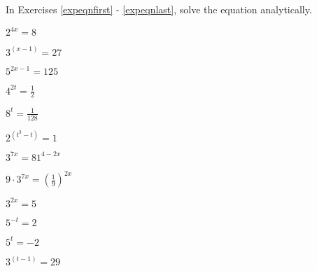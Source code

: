 \documentclass{ximera}
\begin{document}
	\author{Stitz-Zeager}



\label{ExercisesforExponentialEquationsandInequalities}

\begin{question}
In Exercises \ref{expeqnfirst} - \ref{expeqnlast}, solve the equation analytically.

\begin{problem}\label{expeqnfirst}
$2^{4x} = 8$
\end{problem}

\begin{problem}
$3^{(x - 1)} = 27$     
\end{problem} 

\begin{problem}
$5^{2x-1} = 125$     
\end{problem}  

\begin{problem}
$4^{2t} = \frac{1}{2}$     
\end{problem}

\begin{problem}
$8^{t} = \frac{1}{128}$     
\end{problem}

\begin{problem}
$2^{(t^{3} - t)} = 1$      
\end{problem}

\begin{problem}
$3^{7x} = 81^{4-2x}$     
\end{problem} 

\begin{problem}
$9 \cdot 3^{7x} = \left(\frac{1}{9}\right)^{2x}$ 
\end{problem} 

\begin{problem}
$3^{2x} = 5$    
\end{problem}   

\begin{problem}
$5^{-t} = 2$     
\end{problem}

\begin{problem}
$5^{t} = -2$      
\end{problem}

\begin{problem}
$3^{(t - 1)} = 29$    
\end{problem}


\end{question}
\end{document}
